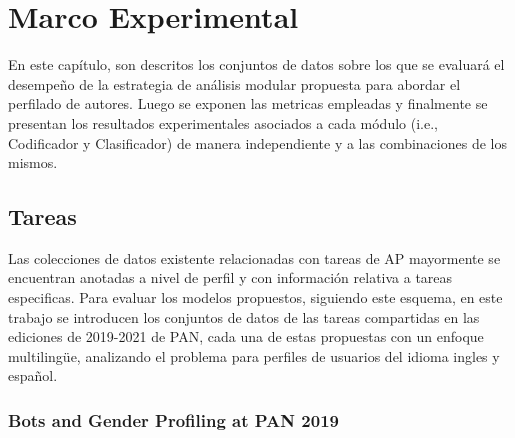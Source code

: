 \chapter{Marco Experimental}


En este capítulo, son descritos los conjuntos de datos sobre los que se evaluará el desempeño de la estrategia de análisis modular propuesta para abordar el perfilado de autores. Luego se exponen las metricas empleadas y finalmente se presentan los resultados experimentales asociados a cada módulo (i.e., Codificador y Clasificador) de manera independiente y a las combinaciones de los mismos.
	
\section{Tareas}
	 
	 Las colecciones de datos existente relacionadas con tareas de AP mayormente se encuentran anotadas a nivel de perfil y con información relativa a tareas especificas. Para evaluar los modelos propuestos, siguiendo este esquema, en este trabajo se introducen los conjuntos de datos de las tareas compartidas en las ediciones de 2019-2021 de PAN, cada una de estas propuestas con un enfoque multilingüe, analizando el problema para perfiles de usuarios del idioma ingles y español.
	 
	 \subsection{Bots and Gender Profiling at PAN 2019}
	 
